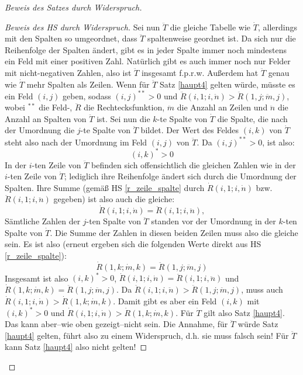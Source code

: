 \begin{proof}[Beweis des Satzes durch Widerspruch]
\begin{proof}[Beweis des HS durch Widerspruch]
        Sei nun $\ddot T$ die gleiche Tabelle wie $\dot T$, allerdings mit den Spalten so umgeordnet, dass $\ddot T$ 
        spaltenweise geordnet ist. Da sich nur die Reihenfolge der Spalten ändert, gibt es in jeder Spalte immer noch 
        mindestens ein Feld mit einer positiven Zahl. Natürlich gibt es auch immer noch nur Felder mit nicht-negativen 
        Zahlen, also ist $\ddot T$ insgesamt f.p.r.w. Außerdem hat $\ddot T$ genau wie $\dot T$ mehr Spalten als Zeilen. 
        Wenn für $\ddot T$ Satz \ref{haupt4} gelten würde, müsste es ein Feld $(i, j)$ geben, sodass $(i, j)^{**}>0$ 
        und $\ddot R(i, 1; i, \ddot n) > \ddot R(1, j; \ddot m, j)$, wobei $^{**}$ die Feld-, $\ddot R$ die 
        Rechtecksfunktion, $\ddot m$ die Anzahl an Zeilen und $\ddot n$ die Anzahl an Spalten von $\ddot T$ ist. 
        Sei nun die $k$-te Spalte von $\dot T$ die Spalte, die nach der Umordnung die $j$-te Spalte von $\ddot T$ 
        bildet. Der Wert des Feldes $(i, k)$ von $\dot T$ steht also nach der Umordnung im Feld $(i, j)$ von 
        $\ddot T$. Da $(i, j)^{**}>0$, ist also:
        \[
            (i, k)^*>0
        \]
        In der $i$-ten Zeile von $\ddot T$ befinden sich offensichtlich die gleichen Zahlen wie in der $i$-ten Zeile 
        von $\dot T$; lediglich ihre Reihenfolge ändert sich durch die Umordnung der Spalten. Ihre Summe (gemäß HS 
        \ref{r_zeile_spalte} durch $\dot R(i, 1; i, \dot n)$ bzw. $\ddot R(i, 1; i, \ddot n)$ gegeben) ist also auch 
        die gleiche:
        \[
            \dot R(i, 1; i, \dot n)=\ddot R(i, 1; i, \ddot n),
        \]
        Sämtliche Zahlen der $j$-ten Spalte von $\ddot T$ standen vor der Umordnung in der $k$-ten Spalte von $\dot T$. 
        Die Summe der Zahlen in diesen beiden Zeilen muss also die gleiche sein. Es ist also (erneut ergeben sich die 
        folgenden Werte direkt aus HS \ref{r_zeile_spalte}):
        \[
            \dot R(1, k; \dot m, k)=\ddot R(1, j; \ddot m, j)
        \]
        Insgesamt ist also $(i, k)^*>0$, $\dot R(i, 1; i, \dot n)=\ddot R(i, 1; i, \ddot n)$ und $\dot R(1, k; 
        \dot m, k)=\ddot R(1, j; \ddot m, j)$. Da $\ddot R(i, 1; i, \ddot n)>\ddot R(1, j; \ddot m, j)$, muss auch 
        $\dot R(i, 1; i, \dot n)>\dot R(1, k; \dot m, k)$. Damit gibt es aber ein Feld $(i, k)$ mit $(i, k)^*>0$ und 
        $\dot R(i, 1; i, \dot n)>\dot R(1, k; \dot m, k)$. Für $\dot T$ gilt also Satz \ref{haupt4}. Das kann aber--wie 
        oben gezeigt--nicht sein. Die Annahme, für $\ddot T$ würde Satz \ref{haupt4} gelten, führt also zu einem 
        Widerspruch, d.h. sie muss falsch sein! Für $\ddot T$ kann Satz \ref{haupt4} also nicht gelten!


\end{proof}
\end{proof}
